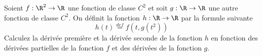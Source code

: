 
\begin{exercice}\label{exo0055}


Soient $f: \R^2 \rightarrow \R$ une fonction de classe $C^2$ et
soit $g:\R \rightarrow \R$ une autre fonction de classe $C^2$. On définit
la fonction $h:\R \rightarrow \R$ par la formule suivante
\[
h(t) \stackrel{def}= f(t,g(t^2))
\]
Calculez la dérivée première et la dérivée seconde de la fonction
$h$ en fonction des dérivées partielles de la fonction $f$ et des
dérivées de la fonction $g$.


\end{exercice}
